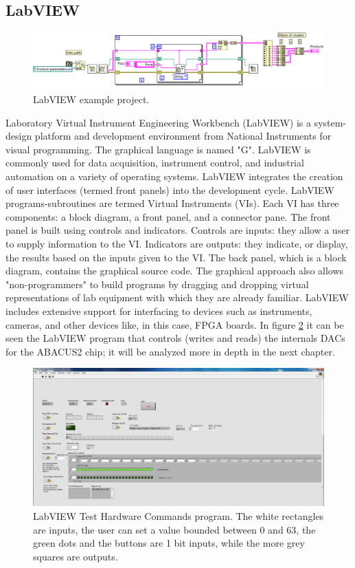 \subsection{LabVIEW}
\begin{figure}[H]
	\centering
	\includegraphics[width=0.9\linewidth]{IMG/ch3/LABVIEW}
	\caption{LabVIEW example project.}
	\label{fig:labview}
\end{figure}
\noindent Laboratory Virtual Instrument Engineering Workbench (LabVIEW) is a system-design platform and development environment from National Instruments for visual programming.
The graphical language is named "G". LabVIEW is commonly used for data acquisition, instrument control, and industrial automation on a variety of operating systems.
LabVIEW integrates the creation of user interfaces (termed front panels) into the development cycle. LabVIEW programs-subroutines are termed Virtual Instruments (VIs). Each VI has three components: a block diagram, a front panel, and a connector pane.
The front panel is built using controls and indicators. Controls are inputs: they allow a user to supply information to the VI. Indicators are outputs: they indicate, or display, the results based on the inputs given to the VI. The back panel, which is a block diagram, contains the graphical source code.
\newline
\noindent The graphical approach also allows "non-programmers" to build programs by dragging and dropping virtual representations of lab equipment with which they are already familiar.
\newline
LabVIEW includes extensive support for interfacing to devices such as instruments, cameras, and other devices like, in this case, FPGA boards.
\newline
In figure \ref{fig:labview2} it can be seen the LabVIEW program that controls (writes and reads) the internals DACs for the ABACUS2 chip; it will be analyzed more in depth in the next chapter.
\begin{figure}[H]
	\centering
	\includegraphics[width=0.8\linewidth]{IMG/ch3/LABVIEW2}
	\caption{LabVIEW Test Hardware Commands program. The white rectangles are inputs, the user can set a value bounded between 0 and 63, the green dots and the buttons are 1 bit inputs, while the more grey squares are outputs.}
	\label{fig:labview2}
\end{figure}



